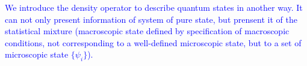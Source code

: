 

\textcolor{blue}{
We introduce the density operator to describe quantum states in another way.
It can not only present information of system of pure state, but prensent it of the statistical mixture (macroscopic state defined by specification of macroscopic conditions, not corresponding to a well-defined microscopic state, but to a set of microscopic state $\{\psi_i\}$).
}